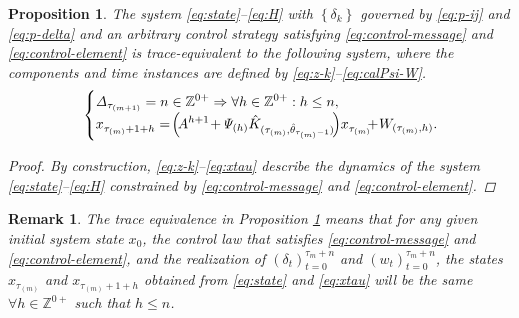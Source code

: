 \documentclass[journal,twoside,web]{ieeecolor}
\newtheorem{remark}{Remark}
\newtheorem{proposition}{Proposition}
\begin{document}
\begin{proposition}\label{prop:equiv}
    The system \eqref{eq:state}--\eqref{eq:H} 
    with $\left\{\delta_{k}\right\}$ governed by \eqref{eq:p-ij} and \eqref{eq:p-delta} and an arbitrary control strategy satisfying \eqref{eq:control-message} and \eqref{eq:control-element} is trace-equivalent to the following system, where the components and time instances are defined by \eqref{eq:z-k}--\eqref{eq:calPsi-W}.
    \begin{equation}\label{eq:xtau}
    \text{\small $
    \begin{cases}
        \mathit{\Delta}_{\tau_{(m+1)}} = n \in \mathbb{Z}^{0+}  \Rightarrow  \forall h \in \mathbb{Z}^{0+} : h \leq n, \\
         x_{\tau_{(m)}+1+h}^{} =\! \Big(\!A^{h+1} \!+\! \mathit{\Psi}_{(h)}\hat{K}_{(\tau_{(m)},\hat{\theta}_{\tau_{(m)}-1})}\!\Big)x_{\tau_{(m)}}^{} \!\!\!+\! W_{(\tau_{(m)},h)}.\!\!\!\!\!\!\!
    \end{cases}$}
    \end{equation}
    \begin{proof}
        By construction, \eqref{eq:z-k}--\eqref{eq:xtau} describe the dynamics of the system \eqref{eq:state}--\eqref{eq:H} constrained by \eqref{eq:control-message} and \eqref{eq:control-element}.
    \end{proof}
\end{proposition}
\begin{remark}\label{rem:trace-equivalence}
The trace equivalence in Proposition \ref{prop:equiv} means that for any given initial system state $x_{0}$, the control law that satisfies \eqref{eq:control-message} and \eqref{eq:control-element}, and the realization of $\left(\delta_{t}\right)_{t=0}^{\tau_{m}+n}$ and $\left(w_{t}\right)_{t=0}^{\tau_{m}+n}$, the states $x_{\tau_{(m)}}$ and $x_{\tau_{(m)}+1+h}$ obtained from \eqref{eq:state} and \eqref{eq:xtau} will be the same $\forall h\in \mathbb{Z}^{0+}$ such that $h\leq n$. 
\end{remark}
\end{document}

